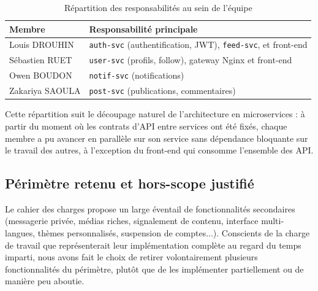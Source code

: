 \documentclass{cesi}
\begin{document}
\begin{table}[H]
\centering
\begin{tabularx}{\linewidth}{l X}
\toprule
\textbf{Membre} & \textbf{Responsabilité principale} \\
\midrule
Louis DROUHIN     & \texttt{auth-svc} (authentification, JWT), \texttt{feed-svc}, et front-end \\
Sébastien RUET    & \texttt{user-svc} (profils, follow), gateway Nginx et front-end \\
Owen BOUDON       & \texttt{notif-svc} (notifications) \\
Zakariya SAOULA   & \texttt{post-svc} (publications, commentaires) \\
\bottomrule
\end{tabularx}
\caption{Répartition des responsabilités au sein de l'équipe}
\end{table}

Cette répartition suit le découpage naturel de l'architecture en microservices : à
partir du moment où les contrats d'API entre services ont été fixés, chaque membre a
pu avancer en parallèle sur son service sans dépendance bloquante sur le
travail des autres, à l'exception du front-end qui consomme l'ensemble des API.

\subsection{Périmètre retenu et hors-scope justifié}

Le cahier des charges propose un large éventail de fonctionnalités secondaires
(messagerie privée, médias riches, signalement de contenu, interface multi-langues,
thèmes personnalisés, suspension de comptes...). Conscients de la charge de travail
que représenterait leur implémentation complète au regard du temps imparti, nous avons
fait le choix de retirer volontairement plusieurs fonctionnalités du périmètre,
plutôt que de les implémenter partiellement ou de manière peu aboutie.
\end{document}
